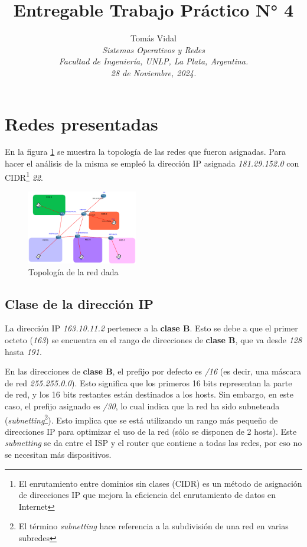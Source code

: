 \documentclass[letterpaper, 10 pt, conference]{ieeeconf}  %
\title{\LARGE \bf Entregable Trabajo Práctico N° 4}
\author{
  Tom\'as Vidal\\
  {\it Sistemas Operativos y Redes}\\
  {\it Facultad de Ingenier\'ia, UNLP, La Plata, Argentina.}\\
  {\it 28 de Noviembre, 2024.}
}                                            %
\begin{document}
\maketitle
\thispagestyle{empty}
\pagestyle{empty}

\section{Redes presentadas}
En la figura \ref{fig:red_dada} se muestra la topología de las redes que fueron asignadas. Para hacer el análisis de la misma se empleó la dirección IP asignada \textit{181.29.152.0} con CIDR\footnote{El enrutamiento entre dominios sin clases (CIDR) es un método de asignación de direcciones IP que mejora la eficiencia del enrutamiento de datos en Internet} \textit{22}.

\begin{figure}[H]
	\centering
	\includegraphics[width=0.43\textwidth]{./Imagenes/red_topologia.png}
	\caption{Topología de la red dada}
	\label{fig:red_dada}
\end{figure}

\subsection{Clase de la dirección IP}
La dirección IP \textit{163.10.11.2} pertenece a la \textbf{clase B}. Esto se debe a que el primer octeto (\textit{163}) se encuentra en el rango de direcciones de \textbf{clase B}, que va desde \textit{128} hasta \textit{191}.

En las direcciones de \textbf{clase B}, el prefijo por defecto es \textit{/16} (es decir, una máscara de red \textit{255.255.0.0}). Esto significa que los primeros 16 bits representan la parte de red, y los 16 bits restantes están destinados a los hosts. Sin embargo, en este caso, el prefijo asignado es \textit{/30}, lo cual indica que la red ha sido subneteada (\textit{subnetting}\footnote{El término \textit{subnetting} hace referencia a la subdivisión de una red en varias subredes}). Esto implica que se está utilizando un rango más pequeño de direcciones IP para optimizar el uso de la red (sólo se disponen de 2 hosts). Este \textit{subnetting} se da entre el ISP y el router que contiene a todas las redes, por eso no se necesitan más dispositivos.
\end{document}
